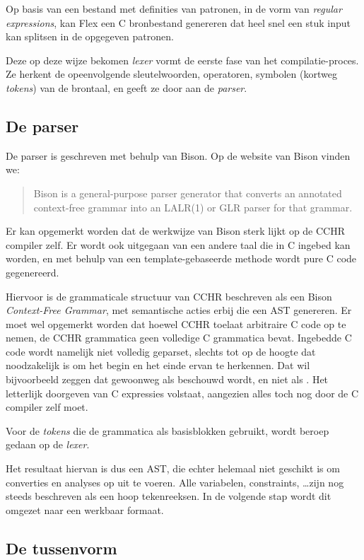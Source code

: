 Op basis van een bestand met definities van patronen, in de vorm van {\em regular expressions}, kan Flex een C bronbestand genereren dat heel snel een stuk input kan splitsen in de opgegeven patronen. 

Deze op deze wijze bekomen {\em lexer} vormt de eerste fase van het compilatie-proces. Ze herkent de opeenvolgende sleutelwoorden, operatoren, symbolen (kortweg {\em tokens}) van de brontaal, en geeft ze door aan de {\em parser}.

\subsection{De parser}

De parser is geschreven met behulp van Bison. Op de website van Bison vinden we: \begin{quote}
  Bison is a general-purpose parser generator that converts an annotated context-free grammar into an LALR(1) or GLR parser for that grammar.
\end{quote}

Er kan opgemerkt worden dat de werkwijze van Bison sterk lijkt op de CCHR compiler zelf. Er wordt ook uitgegaan van een andere taal die in C ingebed kan worden, en met behulp van een template-gebaseerde methode wordt pure C code gegenereerd.

Hiervoor is de grammaticale structuur van CCHR beschreven als een Bison {\em Context-Free Grammar}, met semantische acties erbij die een AST genereren. Er moet wel opgemerkt worden dat hoewel CCHR toelaat arbitraire C code op te nemen, de CCHR grammatica geen volledige C grammatica bevat. Ingebedde C code wordt namelijk niet volledig geparset, slechts tot op de hoogte dat noodzakelijk is
om het begin en het einde ervan te herkennen. Dat wil bijvoorbeeld zeggen dat  gewoonweg als  beschouwd wordt, en niet als . Het letterlijk doorgeven van C expressies volstaat, aangezien alles toch nog
door de C compiler zelf moet.

Voor de {\em tokens} die de grammatica als basisblokken gebruikt, wordt beroep gedaan op de {\em lexer}.

Het resultaat hiervan is dus een AST, die echter helemaal niet geschikt is om converties en analyses op uit te voeren. Alle variabelen, constraints, \ldots zijn nog steeds beschreven als een hoop tekenreeksen. In de volgende stap wordt dit omgezet naar een werkbaar formaat. 

\subsection{De tussenvorm}

